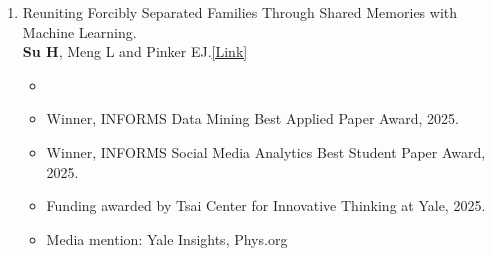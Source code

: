 \documentclass[letterpaper,11pt]{article}
\newif\ifpublic
\newcommand{\PrivatePaperStatusFamilyReunion}{Preparing for Submission to \textit{Management Science}}
\newcommand{\PublicPaperStatusFamilyReunion}{Preparing for Submission to \textit{Management Science}}
\newcommand{\PaperStatusFamilyReunion}{\ifpublic\PublicPaperStatusFamilyReunion\else\PrivatePaperStatusFamilyReunion\fi}
\begin{document}
\begin{enumerate}
    \item Reuniting Forcibly Separated Families Through Shared Memories with Machine Learning.\\ \textbf{Su H}, Meng L and Pinker EJ.\href{https://drive.google.com/file/d/1gnc4BEnxOJDHMa8qjcIGCTcUtESp9k-t/view?usp=sharing}{\textcolor{linkblue}{[Link]}}
    \vspace{-8pt}
    \begin{itemize}
        \item \PaperStatusFamilyReunion
        \vspace{-4pt}
        \item Winner, INFORMS Data Mining Best Applied Paper Award, 2025.
        \vspace{-4pt}
        \item Winner, INFORMS Social Media Analytics Best Student Paper Award, 2025.
        \vspace{-4pt}
        \item Funding awarded by Tsai Center for Innovative Thinking at Yale, 2025.
        \vspace{-4pt}
        \item Media mention: Yale Insights, Phys.org
    \end{itemize}

\end{enumerate}




    
\end{document}
